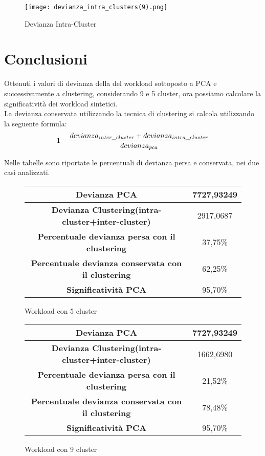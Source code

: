 \begin{figure}[!htbp]
	\texttt{[image: devianza\_intra\_clusters(9).png]}
  \caption{Devianza Intra-Cluster}
  \label{}
\end{figure}
\clearpage
\section{Conclusioni}

Ottenuti i valori di devianza della del workload sottoposto a PCA e successivamente
a clustering, considerando 9 e 5 cluster, ora possiamo calcolare la significatività
dei workload sintetici.\\
La devianza conservata utilizzando la tecnica di clustering si calcola utilizzando
la seguente formula:
$$1-{devianza_{inter\_cluster}+devianza_{intra\_cluster}\over {devianza_{pca}}}$$

Nelle tabelle sono riportate le percentuali di devianza persa e conservata, nei due
casi analizzati.\\
\vspace{5 mm}

\begin{figure}[!htbp]
  \centering
  \begin{tabular}{|c|c|}
  \hline
  \textbf{Devianza PCA}	& 7727,93249 \\
  \hline
  \textbf{Devianza Clustering(intra-cluster+inter-cluster)}	& 2917,0687 \\
  \hline
  \textbf{Percentuale devianza persa con il clustering}	& 37,75\% \\
  \hline
  \textbf{Percentuale devianza conservata con il clustering}	& 62,25\% \\
  \hline
  \textbf{Significatività PCA} &	95,70\% \\
  \hline
  \end{tabular}
  \caption{Workload con 5 cluster}
\end{figure}


\vspace{5 mm}

\begin{figure}[!htbp]
  \begin{tabular}{|c|c|}
  \hline
  \textbf{Devianza PCA}	& 7727,93249 \\
  \hline
  \textbf{Devianza Clustering(intra-cluster+inter-cluster)}	& 1662,6980 \\
  \hline
  \textbf{Percentuale devianza persa con il clustering}	& 21,52\% \\
  \hline
  \textbf{Percentuale devianza conservata con il clustering}	& 78,48\% \\
  \hline
  \textbf{Significatività PCA} &	95,70\% \\
  \hline
  \end{tabular}
  \caption{Workload con 9 cluster}
\end{figure}

